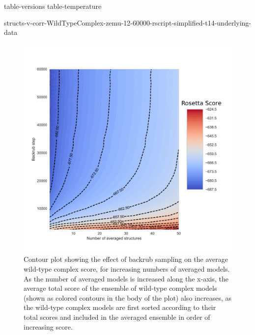 \documentclass[journal=jpcbfk,manuscript=suppinfo]{achemso}
\begin{document}
\renewcommand{\thefigure}{S\arabic{figure}}
\setcounter{figure}{0}
\renewcommand{\thetable}{S\arabic{table}}
\setcounter{table}{0}
\renewcommand*{\thepage}{S\arabic{page}}

{table-versions}
{table-temperature}
\clearpage

\clearpage

  {\small
    {structs-v-corr-WildTypeComplex-zemu-12-60000-rscript-simplified-t14-underlying-data}
  }
\clearpage

\begin{figure}
  \centering
  \includegraphics[width=\textwidth,keepaspectratio]{figures/wildtypecomplex-scores-complete.pdf}
  \caption{
    Contour plot showing the effect of backrub sampling on the average wild-type complex score, for increasing numbers of averaged models. As the number of averaged models is increased along the x-axis, the average total score of the ensemble of wild-type complex models (shown as colored contours in the body of the plot) also increases, as the wild-type complex models are first sorted according to their total scores and included in the averaged ensemble in order of increasing score.
}
\end{figure}
\end{document}
